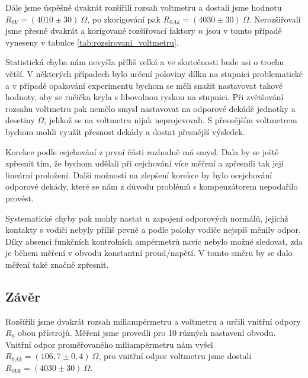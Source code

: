 \documentclass[english]{article}
\begin{document}
Dále jsme úspěšně dvakrát rozšířili rozsah voltmetru a dostali jsme hodnotu $R_{0V} = (4010 \pm 30)\ \Omega$, po zkorigování pak $R_{0Ak} = (4030 \pm 30)\ \Omega$. Nerozšiřovali jsme přesně dvakrát a korigované rozšiřovací faktory $n$ jsou v tomto případě vyneseny v tabulce \ref{tab:rozsirovani_voltmetru}.

Statistická chyba nám nevyšla příliš velká a ve skutečnosti bude asi o trochu větší. V některých případech bylo určení poloviny dílku na stupnici problematické a v případě opakování experimentu bychom se měli snažit nastavovat takové hodnoty, aby se ručička kryla s libovolnou ryskou na stupnici. Při zvětšování rozsahu voltmetru pak nemělo smysl nastavovat na odporové dekádě jednotky a desetiny $\Omega$, jelikož se na voltmetru nijak neprojevovali. S přesnějším voltmetrem bychom mohli využít přesnost dekády a dostat přesnější výsledek.

Korekce podle cejchování z první části rozhodně má smysl. Dala by se ještě zpřesnit tím, že bychom udělali při cejchování více měření a zpřesnili tak její lineární proložení. Další možností na zlepšení korekce by bylo ocejchování odporové dekády, které se nám z důvodu problémů s kompenzátorem nepodařilo provést. 
 
Systematické chyby pak mohly nastat u zapojení odporových normálů, jejichž kontakty s vodiči nebyly příliš pevné a podle polohy vodiče nejspíš měnily odpor. Díky absenci funkčních kontrolních ampérmetrů navíc nebylo možné sledovat, zda je během měření v obvodu konstantní proud/napětí. V tomto směru by se dalo měření také značně zpřesnit.

\subsection{Závěr}
Rozšířili jsme dvakrát rozsah miliampérmetru a voltmetru a určili vnitřní odpory $R_0$ obou přístrojů. Měření jsme provedli pro 10 různých nastavení obvodu. Vnitřní odpor proměřovaného miliampérmetru nám vyšel $R_{0Ak} = (106,7 \pm 0,4)\ \Omega$, pro vnitřní odpor voltmetru jsme dostali $R_{0Vk} = (4030 \pm 30)\ \Omega$.
\end{document}
